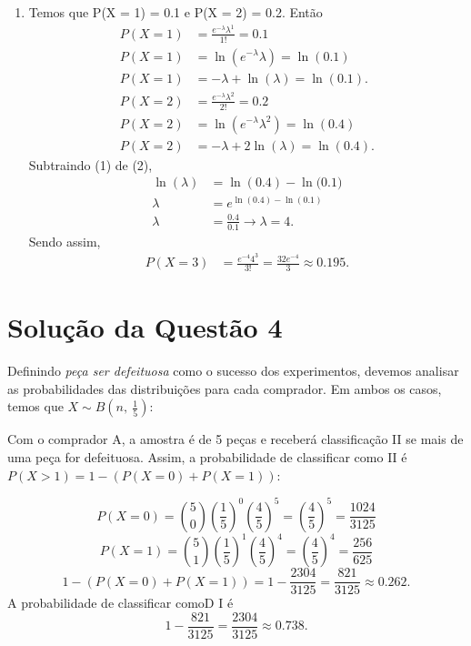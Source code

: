 \documentclass[
	12pt,				%
	openright,			%
	oneside,			%
	a4paper,			%
	english,			%
	brazil,				%
	]{abntex2}
\begin{document}
\begin{enumerate}[label=\alph*)]
    \item Temos que P(X = 1) = 0.1 e P(X = 2) = 0.2. Então
    \begin{align*}
        P(X = 1) &= \frac{e^{-\lambda}\lambda^1}{1!} = 0.1\\[0.5em]
        P(X = 1) &= \ln{(e^{-\lambda}\lambda)} = \ln{(0.1)}\\
        P(X = 1) &= -\lambda + \ln{(\lambda)} = \ln{(0.1)}.\tag{1}\\[1em]
        P(X = 2) &= \frac{e^{-\lambda}\lambda^2}{2!} = 0.2\\[0.5em]
        P(X = 2) &= \ln{(e^{-\lambda}\lambda^2)} = \ln{(0.4)}\\
        P(X = 2) &= -\lambda + 2\ln{(\lambda)} = \ln{(0.4)}.\tag{2}
    \end{align*}
    Subtraindo (1) de (2),
    \begin{align*}
        \ln{(\lambda)} &= \ln{(0.4)} - \ln{(0.1})\\
        \lambda &= e^{\ln{(0.4)} - \ln{(0.1)}}\\
        \lambda &= \frac{0.4}{0.1} \to \lambda = 4.
    \end{align*}
    Sendo assim,
    \begin{align*}
        P(X = 3) &= \frac{e^{-4}4^3}{3!} = \frac{32e^{-4}}{3} \approx 0.195.
    \end{align*}
    
\end{enumerate}


\section{Solução da Questão 4}


Definindo \textit{peça ser defeituosa} como o sucesso dos experimentos, devemos analisar as probabilidades das distribuições para cada comprador. Em ambos os casos, temos que $X \sim B(n,\ \frac{1}{5})$:

Com o comprador A, a amostra é de 5 peças e receberá classificação II se mais de uma peça for defeituosa. Assim, a probabilidade de classificar como II é $P(X > 1) = 1 - (P(X = 0) + P(X = 1))$: 

$$P(X = 0) = \binom{5}{0}\left(\frac{1}{5}\right)^0 \left(\frac{4}{5}\right)^5 = \left(\frac{4}{5}\right)^5 = \frac{1024}{3125}$$
$$P(X = 1) = \binom{5}{1}\left(\frac{1}{5}\right)^1 \left(\frac{4}{5}\right)^4 = \left(\frac{4}{5}\right)^4 = \frac{256}{625}$$
$$1 - (P(X = 0) + P(X = 1)) = 1 - \frac{2304}{3125} = \frac{821}{3125} \approx 0.262.$$
A probabilidade de classificar comoD I é $$1 - \frac{821}{3125} = \frac{2304}{3125} \approx 0.738.$$
\end{document}
